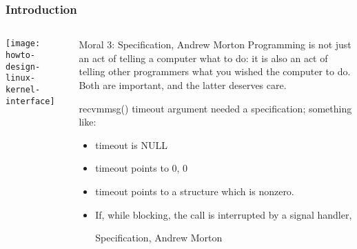 \begin{frame}[plain]
	\frametitle{Introduction}
	
	
	
	\begin{columns}
		
		\begin{column}{.4\textwidth}
			
			\texttt{[image: howto-design-linux-kernel-interface]}
			
		\end{column}
		
		\begin{column}{.6\textwidth}
			\Large
			\begin{block}{Moral 3: Specification, Andrew Morton}
				Programming is not just an act of telling a computer
				what to do: it is also an act of telling other
				programmers what you wished the computer to do.
				Both are important, and the latter deserves care. 
				
				
			\end{block} 
			\normalsize
			recvmmsg() timeout argument needed a specification; something like:
			
			\begin{itemize}
				\item timeout is NULL
				\item timeout points to {0, 0}
				\item timeout points to a structure which is nonzero. 
				\item If, while blocking, the call is interrupted by a signal handler,

				Specification, Andrew Morton
			\end{itemize}
		\end{column}
		
		
	\end{columns}
	
	
\end{frame}



